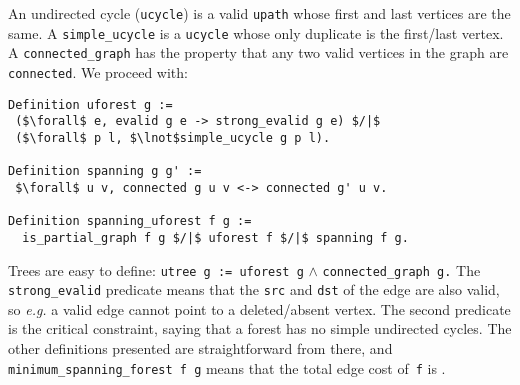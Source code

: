 An undirected cycle (\texttt{ucycle}) is a valid \texttt{upath} whose first 
and last vertices are the same.  A \texttt{simple\_ucycle} is a \texttt{ucycle} whose
only duplicate is the first/last vertex. A \texttt{connected\_graph}
has the property that any two valid vertices in the graph are \texttt{connected}.
We proceed with:
\lstset{style=CoqStyle}
\begin{lstlisting}
Definition uforest g := 
 ($\forall$ e, evalid g e -> strong_evalid g e) $/|$
 ($\forall$ p l, $\lnot$simple_ucycle g p l).

Definition spanning g g' := 
 $\forall$ u v, connected g u v <-> connected g' u v.

Definition spanning_uforest f g :=
  is_partial_graph f g $/|$ uforest f $/|$ spanning f g. 
\end{lstlisting}
Trees are easy to define:
\texttt{utree~g~:= uforest~g} $\wedge$ \texttt{connected\_graph~g.}
The \texttt{strong\_evalid} predicate means that the 
\texttt{src} and \texttt{dst} of the edge are also valid, so
\emph{e.g.} a valid edge cannot point to a deleted/absent vertex.
The second predicate is the critical constraint, saying that a
forest has no simple undirected cycles. The other definitions presented
are straightforward from there, and 
\texttt{minimum\_spanning\_forest f g} means that the total edge cost 
of~\texttt{f} is .




